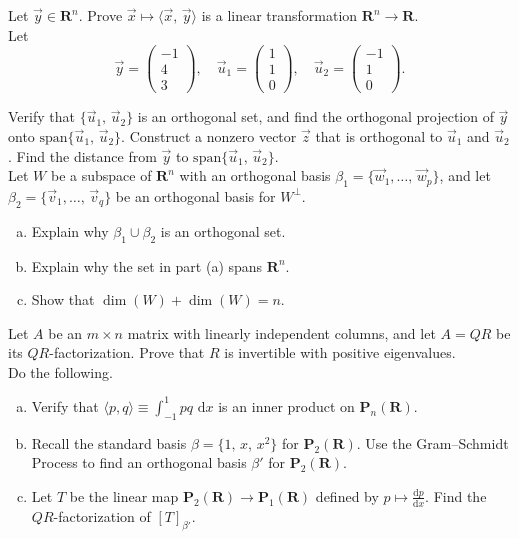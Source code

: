 \documentclass[a4paper,11pt]{article}
\newcommand{\R}{\mathbf{R}}
\newcommand{\PP}{\mathbf{P}}
\begin{document}
 Let $\vec y \in \R^n$. Prove $\vec x \mapsto
\langle \vec x,\,\vec y \rangle$ is a linear transformation $\R^n \rightarrow
\R$. \\

 Let
\[
  \vec y =
  \left(
    \begin{array}{r}
      -1\\4\\3
    \end{array}
  \right), \quad
  \vec u_1 =
  \left(
    \begin{array}{r}
      1\\1\\0
    \end{array}
  \right), \quad
  \vec u_2 =
  \left(
    \begin{array}{r}
      -1\\1\\0
    \end{array}
  \right).
\]

\noindent Verify that $\{\vec u_1,\,\vec u_2\}$ is an orthogonal set, and find
the orthogonal projection of $\vec y$ onto $\text{span}\{\vec u_1,\,\vec u_2\}$.
Construct a nonzero vector $\vec z$ that is orthogonal to $\vec u_1$ and $\vec
u_2$. Find the distance from $\vec y$ to $\text{span}\{\vec u_1,\,\vec u_2\}$.
\\

 Let $W$ be a subspace of $\R^n$ with an orthogonal
basis $\beta_1=\{\vec w_1, \dots,\,\vec w_p\}$, and let $\beta_2=\{\vec
v_1,\dots,\,\vec v_q\}$ be an orthogonal basis for $W^\perp$.
\begin{enumerate}[(a)]
\item Explain why $\beta_1 \cup \beta_2$ is an orthogonal set.
\item Explain why the set in part (a) spans $\R^n$.
\item Show that $\dim(W)+\dim(W)=n$. \\
\end{enumerate}

 Let $A$ be an $m \times n$ matrix with linearly
independent columns, and let $A=QR$ be its $QR$-factorization. Prove that $R$ is
invertible with positive eigenvalues. \\

 Do the following.
\begin{enumerate}[(a)]
\item Verify that $\langle p,q \rangle \equiv \int_{-1}^1pq\text{ d}x$ is an
  inner product on $\PP_n(\R)$.
\item Recall the standard basis $\beta=\{1,\,x,\,x^2\}$ for $\PP_2(\R)$. Use the
  Gram--Schmidt Process to find an orthogonal basis $\beta'$ for $\PP_2(\R)$.
\item Let $T$ be the linear map $\PP_2(\R) \rightarrow \PP_1(\R)$ defined by $p
  \mapsto \frac{\text{d}p}{\text{d}x}$. Find the $QR$-factorization of
  $[T]_{\beta'}$.
\end{enumerate}
\end{document}
